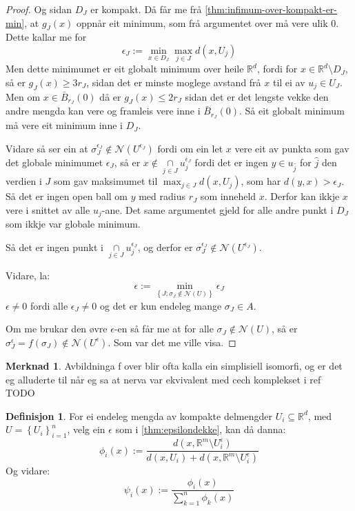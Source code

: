 \documentclass[a4paper, titlepage, 12pt, norsk]{article}
\theoremstyle{plain}
\theoremstyle{definition}
\newtheorem{definition}[theorem]{Definisjon}
\newtheorem{remark}[theorem]{Merknad}
\newcommand{\Rb}{\mathbb{R}}
\newcommand{\Nc}{\mathcal{N}}
\newcommand{\intersect}{ \mathop{\cap}\limits } %
\newcommand{\set}[1]{ \left \{ #1 \right \} } %
\begin{document}
\begin{proof}
	Og sidan \( D_J \) er kompakt. Då får me frå \autoref{thm:infimum-over-kompakt-er-min}, at \( g_J(x) \) oppnår eit minimum, som frå argumentet over må vere ulik \( 0 \). Dette kallar me for
	\[
		\epsilon_J := \min_{x \in D_J} \max_{j \in J} d(x, U_j) 
	\]
	Men dette minimumet er eit globalt minimum over heile \( \Rb^d \), fordi for \( x \in \Rb^d \setminus D_J \), så er \( g_J(x) \geq 3r_J \), sidan det er minste moglege avstand frå \( x \) til ei av \( u_j \in U_J \). Men om \( x \in \bar{B}_{r_J}(0) \) då er \( g_J(x) \leq 2r_J \) sidan det er det lengste vekke den andre mengda kan vere og framleis vere inne i \( \bar{B}_{r_J}(0) \). Så eit globalt minimum må vere eit minimum inne i \( D_J \).

	Vidare så ser ein at \( \sigma_J^{\epsilon_J} \not\in \Nc(U^{\epsilon_J}) \) fordi om ein let \( x \) vere eit av punkta som gav det globale minimumet \( \epsilon_J \), så er \( x \not\in \intersect_{j \in J} u_j^{\epsilon_J} \) fordi det er ingen \( y \in  u_{\hat{j}} \) for \( \hat{j} \) den verdien i \( J \) som gav maksimumet til \( \max_{j \in J} d(x, U_j) \), som har \( d(y, x) > \epsilon_J \). Så det er ingen open ball om \( y \) med radius \( r_J \) som inneheld \( x \). Derfor kan ikkje \( x \) vere i snittet av alle \( u_j \)-ane. Det same argumentet gjeld for alle andre punkt i \( D_J \) som ikkje var globale minimum.
	
	Så det er ingen punkt i \( \intersect_{j \in J} u_j^{\epsilon_J} \), og derfor er \( \sigma_J^{\epsilon_J} \not\in \Nc(U^{\epsilon_J}) \).

	Vidare, la: 
	\[
		\epsilon := \min_{\set{J : \sigma_J \not\in \Nc(U)}} \epsilon_J
	\]
	\( \epsilon \neq 0 \) fordi alle \( \epsilon_J \neq 0 \) og det er kun endeleg mange \( \sigma_J \in A \).

	Om me brukar den øvre \( \epsilon \)-en så får me at for alle \( \sigma_J \not\in \Nc(U) \), så er \( \sigma_J^{\epsilon}=f(\sigma_J) \not\in \Nc(U^{\epsilon}) \). Som var det me ville visa.

\end{proof}

\begin{remark}
	Avbildninga f over blir ofta kalla ein simplisiell isomorfi, og er det eg alluderte til når eg sa at nerva var ekvivalent med cech komplekset i ref TODO
\end{remark}

\begin{definition} \label{def:psi} %
	For ei endeleg mengda av kompakte delmengder \( U_i \subseteq \Rb^d \), med \( U = \set{U_i}_{i=1}^n \), velg ein \( \epsilon \) som i \autoref{thm:epsilondekke}, kan då danna:
	\[
		\phi_i(x) := \frac{d(x, \Rb^m \setminus U_i^\epsilon)}{d(x, U_i) + d(x, \Rb^m \setminus U_i^\epsilon)}
	\]
	Og vidare:
	\[
		\psi_i(x) := \frac{\phi_i(x)}{\sum_{k=1}^n \phi_k(x)}
	\]
\end{definition}
\end{document}
